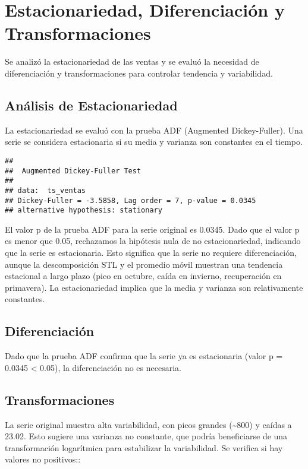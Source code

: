 \documentclass[
]{book}
\begin{document}
\section{Estacionariedad, Diferenciación y Transformaciones}\label{estacionariedad-diferenciaciuxf3n-y-transformaciones}

Se analizó la estacionariedad de las ventas y se evaluó la necesidad de diferenciación y transformaciones para controlar tendencia y variabilidad.

\subsection{Análisis de Estacionariedad}\label{anuxe1lisis-de-estacionariedad}

La estacionariedad se evaluó con la prueba ADF (Augmented Dickey-Fuller). Una serie se considera estacionaria si su media y varianza son constantes en el tiempo.

\begin{verbatim}
## 
##  Augmented Dickey-Fuller Test
## 
## data:  ts_ventas
## Dickey-Fuller = -3.5858, Lag order = 7, p-value = 0.0345
## alternative hypothesis: stationary
\end{verbatim}

El valor p de la prueba ADF para la serie original es 0.0345. Dado que el valor p es menor que 0.05, rechazamos la hipótesis nula de no estacionariedad, indicando que la serie es estacionaria. Esto significa que la serie no requiere diferenciación, aunque la descomposición STL y el promedio móvil muestran una tendencia estacional a largo plazo (pico en octubre, caída en invierno, recuperación en primavera). La estacionariedad implica que la media y varianza son relativamente constantes.

\subsection{Diferenciación}\label{diferenciaciuxf3n}

Dado que la prueba ADF confirma que la serie ya es estacionaria (valor p = 0.0345 \textless{} 0.05), la diferenciación no es necesaria.

\subsection{Transformaciones}\label{transformaciones}

La serie original muestra alta variabilidad, con picos grandes (\textasciitilde800) y caídas a 23.02. Esto sugiere una varianza no constante, que podría beneficiarse de una transformación logarítmica para estabilizar la variabilidad. Se verifica si hay valores no positivos::
\end{document}
